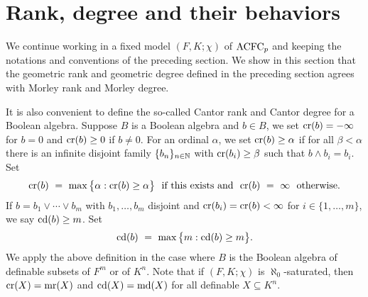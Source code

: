 \section{Rank, degree and their behaviors}

\begin{comment}

\begin{lem}
Suppose \((F, K; \chi) \elsub (E, L; \chi) \) are models of \(\TNp \), \( (F, K; \chi)\) countable, \( (E, L; \chi) \)  \(\aleph_1 \)-saturated, and \(a,b \) are elements of \(L\). We have the following:
\begin{enumerate}
\item If \(a,b \) are both transcendental over \(K(\chi(E))  \) then they have the same type over \((F, K; \chi)\).
\item If \(a\) is algebraic over \(K(\chi(E))\), then there is a tuple \(e_a\) of elements of \(E\) and a polynomial \(Q_a(x,y)\) with coefficient in \(K\)  such that \(Q_a(x,e_a) \) is the minimal polynomial of \(a\) over \(K(\chi(E))\). Furthermore, if \(b\) is algebraic over \(K(\chi(E))\), \(e_b, Q_b\) are defined in similar way, \(e_a, e_b \) have the same type over \(F\), \(Q_a=Q_b \), then \( a,b\) have the same type over \((F, K; \chi)\).
\end{enumerate}
\end{lem}

\end{comment}

\noindent
We continue working in a fixed model \( (F, K; \chi) \) of \( \mathrm{ACFC}_p\) and keeping the notations and conventions of the preceding section. We show in this section that the geometric rank and geometric degree defined in the preceding section agrees with Morley rank and Morley degree. 


It is also convenient to define the so-called Cantor rank and Cantor  degree for a Boolean algebra. Suppose $B$ is a Boolean algebra and $b \in B$, we set $\mathrm{cr}(b) = -\infty$ for $b = 0$ and $\mathrm{cr}(b) \geq 0$ if $b \neq 0$. For an ordinal $\alpha$, we set $\mathrm{cr}(b) \geq \alpha $ if for all $\beta< \alpha$ there is an infinite disjoint family $\{ b_n \}_{n \in \mathbb{N}}$ with $\mathrm{cr}(b_i) \geq \beta$ such that $b\wedge b_i = b_i$. Set 
$$\crk(b)\ =\ \max \big\{ \alpha : \crk(b) \geq \alpha \big\}\ \text{ if  this exists and }\ \crk(b)\ =\ \infty\ \text{ otherwise}.$$
If $b = b_1 \vee \cdots \vee b_m$ with $ b_1, \ldots, b_m$ disjoint and $ \mathrm{cr}(b_i) = \mathrm{cr}(b) < \infty $ for $i \in \{ 1, \ldots, m \}$, we say $\mathrm{cd}(b) \geq m$. Set 
$$\mathrm{cd}(b)\ =\ \max \big\{ m : \mathrm{cd}(b) \geq m \big\}.$$
We apply the above definition in the case where $B$ is the Boolean algebra of definable subsets of $F^m$ or of $K^n$. Note that if $(F, K; \chi) $ is $\aleph_0$-saturated, then $\mathrm{cr}(X)= \mathrm{mr}(X)$ and $\mathrm{cd}(X)= \mathrm{md}(X)$ for all definable $X \subseteq K^n$.



